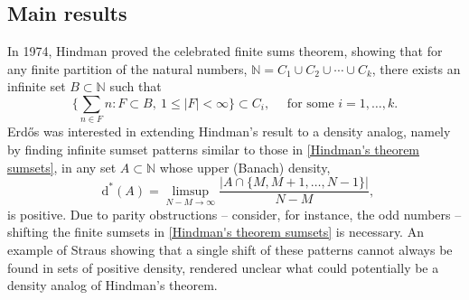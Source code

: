 \documentclass[letter, 11pt]{article}
\theoremstyle{definition}
\theoremstyle{plain}
\newcommand{\N}{\mathbb{N}}
\newcommand*\diff{\mathop{}\!\mathrm{d}}
\newcommand{\1}{\mathbbm{1}}
\begin{document}
\subsection{Main results}
In 1974, Hindman \cite{Hindman74} proved the celebrated finite sums theorem, showing that for any finite partition of the natural numbers, $\N = C_1 \cup C_2 \cup \cdots \cup C_k$, there exists an infinite set $B \subset \N$ such that 
\begin{equation}\label{Hindman's theorem sumsets}
\Big\{ \sum_{n \in F}n \colon F \subset B, \ 1\leq |F| < \infty \Big\} \subset C_i, \quad \text{ for some } i=1, \ldots, k.
\end{equation}
Erd\H{o}s \cite{Erdos77, erdHos1980survey,erdos2006problems} was interested in 
extending Hindman's result to a density analog, namely by finding infinite 
sumset patterns similar to those in \eqref{Hindman's theorem sumsets}, in any set $A\subset \N$ whose upper (Banach) density,
\begin{equation*}
    \diff^{*}(A)=\limsup_{N-M\to \infty}\frac{|A\cap \{M,M+1,\ldots,N-1\}|}{N-M},
\end{equation*}
is positive. Due to parity obstructions -- consider, for instance, the odd numbers -- shifting the finite sumsets in \eqref{Hindman's theorem sumsets} is necessary. An example of Straus \cite[Theorem $11.6$]{Hindman_ultrafilters} showing that a single shift of these patterns cannot always be found in sets of positive density, rendered unclear what could potentially be a density analog of Hindman's theorem.
\end{document}
